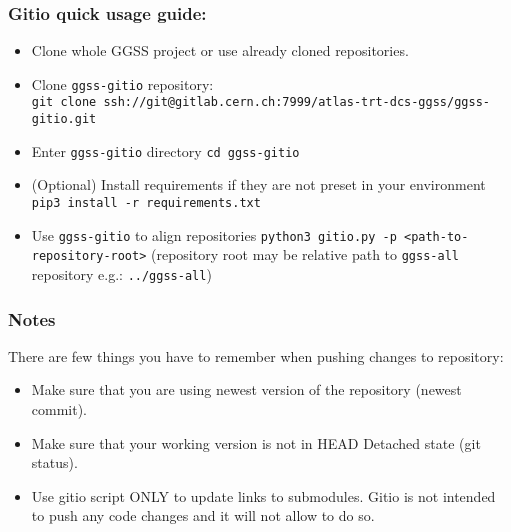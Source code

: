 \subsubsection*{Gitio quick usage guide:}
\begin{itemize}
    \item Clone whole GGSS project or use already cloned repositories.
    \item Clone \lstinline{ggss-gitio} repository: \\\lstinline{git clone ssh://git@gitlab.cern.ch:7999/atlas-trt-dcs-ggss/ggss-gitio.git}
    \item Enter \lstinline{ggss-gitio} directory \lstinline{cd ggss-gitio}
    \item (Optional) Install requirements if they are not preset in your environment \lstinline{pip3 install -r requirements.txt}
    \item Use \lstinline{ggss-gitio} to align repositories \lstinline{python3 gitio.py -p <path-to-repository-root>} (repository root may be relative path to \lstinline{ggss-all} repository e.g.: \lstinline{../ggss-all})
\end{itemize}


\subsubsection*{Notes}
There are few things you have to remember when pushing changes to repository:
\begin{itemize}
    \item Make sure that you are using newest version of the repository (newest commit).
    \item Make sure that your working version is not in HEAD Detached state (git status).
    \item Use gitio script ONLY to update links to submodules. Gitio is not intended to push any code changes and it will not allow to do so.
\end{itemize}

